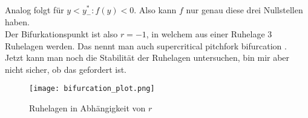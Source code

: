 \begin{solution}
\begin{align*}
\end{align*}
Analog folgt für $y < y_-^*: f(y) < 0$. Also kann $f$ nur genau diese drei Nullstellen haben. \\
Der Bifurkationspunkt ist also $r = -1$, in welchem aus einer Ruhelage 3 Ruhelagen werden.
Das nennt man auch \glqq supercritical pitchfork bifurcation \grqq. \\
Jetzt kann man noch die Stabilität der Ruhelagen untersuchen, bin mir aber
nicht sicher, ob das gefordert ist.
\FloatBarrier
\begin{figure}
    \centering
    \texttt{[image: bifurcation\_plot.png]}
    \caption{Ruhelagen in Abhängigkeit von $r$}
\end{figure}
\FloatBarrier
\end{solution}
